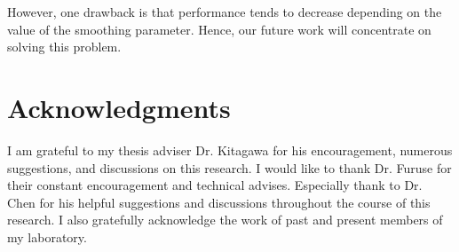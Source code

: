 \documentclass[a4paper,11pt]{report}
\theoremstyle{mytheoremstyle}
\begin{document}
However, one drawback is that performance tends to decrease depending on the value of the smoothing parameter. Hence, our future work will concentrate on solving this problem.


\chapter*{Acknowledgments}
I am grateful to my thesis adviser Dr. Kitagawa for his encouragement, numerous suggestions, and discussions on this research.
I would like to thank Dr. Furuse for their constant encouragement and technical advises.
Especially thank to Dr. Chen for his helpful suggestions and discussions throughout the course of this research.
I also gratefully acknowledge the work of past and present members of my laboratory.

\nocite{ANNH-FICC} %


\end{document}
